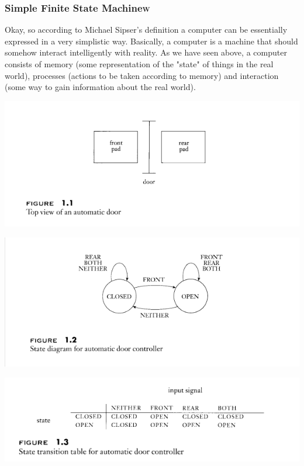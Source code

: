 \documentclass[11pt]{article}
\begin{document}
\subsubsection{Simple Finite State Machine\hfill{}\textsc{w}}
\label{sec:orgc395c56}

Okay, so according to Michael Sipser's definition a computer can be essentially 
expressed in a very simplistic way. Basically, a computer is a machine that should
somehow interact intelligently with reality. As we have seen above, a computer consists
of memory (some representation of the "state" of things in the real world), 
processes (actions to be taken according to memory) and interaction (some way to gain 
information about the real world). 

\begin{center}
\includegraphics[width=.9\linewidth]{../img/doorSetup.png}
\end{center}


\begin{center}
\includegraphics[width=.9\linewidth]{../img/doorFSM.png}
\end{center}


\begin{center}
\includegraphics[width=.9\linewidth]{../img/stateDiagram.png}
\end{center}
\end{document}
